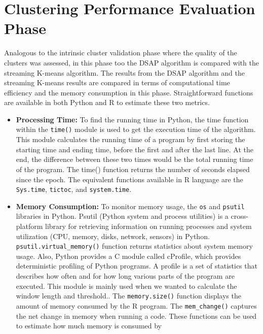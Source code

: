 \documentclass[../UNBThesis2.tex]{subfiles}
\begin{document}
\section{Clustering Performance Evaluation Phase}
Analogous to the intrinsic cluster validation phase where the quality of the clusters was assessed, in this phase too the DSAP algorithm is compared with the streaming K-means algorithm. The results from the DSAP algorithm and the streaming K-means results are compared in terms of computational time efficiency and the memory consumption in this phase. Straightforward functions are available in both Python and R to estimate these two metrics. 
\begin{itemize}
    \item \textbf{Processing Time:} To find the running time in Python, the time function within the \texttt{time()} module is used to get the execution time of the algorithm. This module calculates the running time of a program by first storing the starting time and ending time, before the first and after the last line. At the end, the difference between these two times would be the total running time of the program. The time() function returns the number of seconds elapsed since the epoch. The equivalent functions available in R language are the \texttt{Sys.time}, \texttt{tictoc}, and \texttt{system.time}.

    \item \textbf{Memory Consumption:} To monitor memory usage, the \texttt{os} and \texttt{psutil} libraries in Python. Psutil (Python system and process utilities) is a cross-platform library for retrieving information on running processes and system utilization (CPU, memory, disks, network, sensors) in Python. \texttt{psutil.virtual\_memory()} function returns statistics about system memory usage. Also, Python provides a C module called cProfile, which provides deterministic profiling of Python programs. A profile is a set of statistics that describes how often and for how long various parts of the program are executed. This module is mainly used when we wanted to calculate the window length and threshold.. The \texttt{memory.size()} function displays the amount of memory consumed by the R program. The \texttt{mem\_change()} captures the net change in memory when running a code. These functions can be used to estimate how much memory is consumed by  



\end{itemize}
\end{document}

